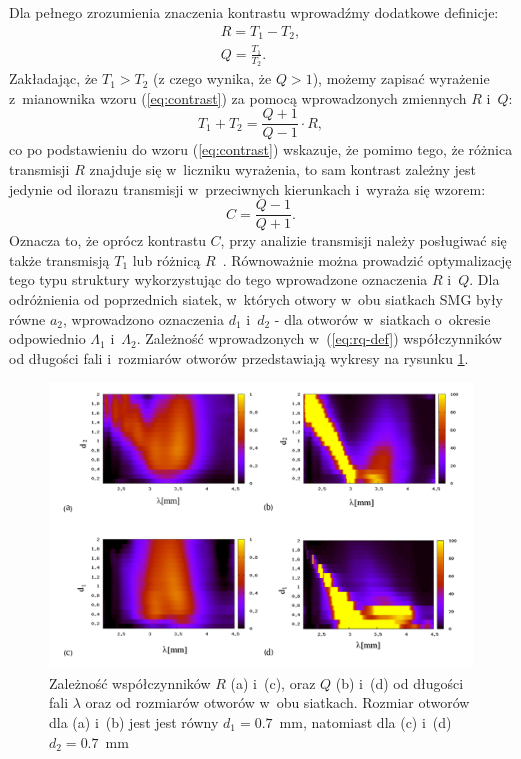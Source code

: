Dla pełnego zrozumienia znaczenia kontrastu wprowadźmy dodatkowe definicje:
\begin{equation}
	\begin{gathered}
	R=T_1-T_2, \\
	Q=\frac{T_1}{T_2}.
	\end{gathered}
	\label{eq:rq-def}
\end{equation}
Zakładając, że $T_1>T_2$ (z czego wynika, że $Q>1$), możemy zapisać wyrażenie z~mianownika wzoru (\ref{eq:contrast}) za pomocą wprowadzonych zmiennych $R$ i~$Q$:
\begin{equation}
	T_1+T_2=\frac{Q+1}{Q-1} \cdot R,
\end{equation}
co po podstawieniu do wzoru (\ref{eq:contrast}) wskazuje, że pomimo tego, że różnica transmisji $R$  znajduje się w~liczniku wyrażenia, to sam kontrast zależny jest jedynie od ilorazu transmisji w~przeciwnych kierunkach i~wyraża się wzorem:
\begin{equation}
	C=\frac{Q-1}{Q+1}
	\label{eq:contrast-Q}.
\end{equation}
Oznacza to, że oprócz kontrastu $C$, przy analizie transmisji należy posługiwać się także transmisją $T_1$ lub różnicą $R$~\cite{stolarek2013broadband}. Równoważnie można prowadzić optymalizację tego typu struktury wykorzystując do tego wprowadzone oznaczenia $R$ i~$Q$. Dla odróżnienia od poprzednich siatek, w~których otwory w~obu siatkach SMG były równe $a_2$, wprowadzono oznaczenia $d_1$ i~$d_2$ - dla otworów w~siatkach o~okresie odpowiednio $\Lambda_1$ i~$\Lambda_2$. Zależność wprowadzonych w~(\ref{eq:rq-def}) współczynników od długości fali i~rozmiarów otworów przedstawiają wykresy na rysunku \ref{fig:qr-od-d}.

\begin{figure}[tb]
	\includegraphics[width=\textwidth]{images/dmg/kontrast_maps.png}
	\caption{Zależność współczynników $R$ (a) i~(c), oraz $Q$ (b) i~(d) od długości fali $\lambda$ oraz od rozmiarów otworów w~obu siatkach. Rozmiar otworów dla (a) i~(b) jest   jest równy $d_1=0.7$~mm, natomiast dla (c) i~(d) $d_2=0.7$~mm }
	\label{fig:qr-od-d}
\end{figure}

